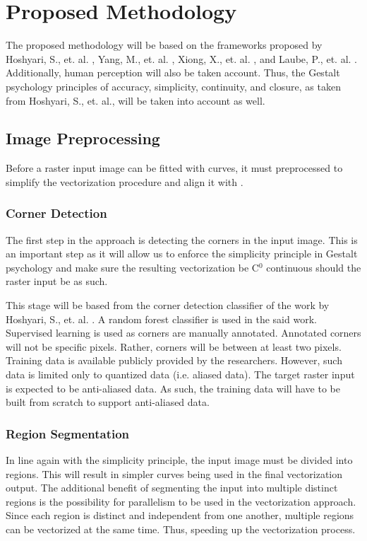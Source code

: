 \chapter{Proposed Methodology}

The proposed methodology will be based on the frameworks proposed by Hoshyari, S., et. al. \cite{hoshyari2018perceptiondriven}, Yang, M., et. al. \cite{effectiveclipartimagevectorization}, Xiong, X., et. al. \cite{realtimevectorizationgpu}, and Laube, P., et. al. \cite{deeplearningparametrization}. Additionally, human perception will also be taken account. Thus, the Gestalt psychology principles of accuracy, simplicity, continuity, and closure, as taken from Hoshyari, S., et. al., will be taken into account as well.

\section{Image Preprocessing}
Before a raster input image can be fitted with curves, it must preprocessed to simplify the vectorization procedure and align it with .

\subsection{Corner Detection}
The first step in the approach is detecting the corners in the input image. This is an important step as it will allow us to enforce the simplicity principle in Gestalt psychology and make sure the resulting vectorization be C$^{0}$ continuous should the raster input be as such.

This stage will be based from the corner detection classifier of the work by Hoshyari, S., et. al. \cite{hoshyari2018perceptiondriven}. A random forest classifier is used in the said work. Supervised learning is used as corners are manually annotated. Annotated corners will not be specific pixels. Rather, corners will be between at least two pixels. Training data is available publicly provided by the researchers. However, such data is limited only to quantized data (i.e. aliased data). The target raster input is expected to be anti-aliased data. As such, the training data will have to be built from scratch to support anti-aliased data.

\subsection{Region Segmentation}
In line again with the simplicity principle, the input image must be divided into regions. This will result in simpler curves being used in the final vectorization output. The additional benefit of segmenting the input into multiple distinct regions is the possibility for parallelism to be used in the vectorization approach. Since each region is distinct and independent from one another, multiple regions can be vectorized at the same time. Thus, speeding up the vectorization process.

